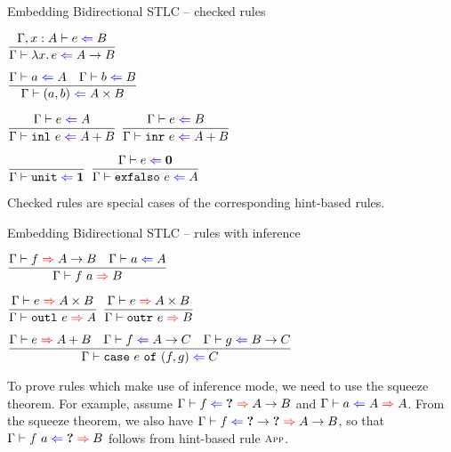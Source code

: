 \documentclass{beamer}
\begin{document}
\begin{frame}{Embedding Bidirectional STLC -- checked rules}

\begin{center}
  $\infrule{\fullcheck{\extend{\Gamma}{x}{A}}{e}{B}}{\check{\fun{x}{e}}{\Fun{A}{B}}}$

  \vspace{2em}

  $\infrule{\check{a}{A} \quad \check{b}{B}}{\check{\pair{a}{b}}{\Prod{A}{B}}}$

  \vspace{2em}

  $\infrule{\check{e}{A}}{\check{\inl{e}}{\Sum{A}{B}}}$ \quad
  $\infrule{\check{e}{B}}{\check{\inr{e}}{\Sum{A}{B}}}$

  \vspace{2em}

  $\infrule{}{\check{\unit}{\Unit}}$ \quad
  $\infrule{\check{e}{\Empty}}{\check{\exfalso{e}}{A}}$
\end{center}

\vspace{1em}

Checked rules are special cases of the corresponding hint-based rules.

\end{frame}

\begin{frame}{Embedding Bidirectional STLC -- rules with inference}

\begin{center}
  $\infrule{\infer{f}{\Fun{A}{B}} \quad \check{a}{A}}{\infer{\app{f}{a}}{B}}$

  \vspace{2em}

  $\infrule{\infer{e}{\Prod{A}{B}}}{\infer{\outl{e}}{A}}$ \quad
  $\infrule{\infer{e}{\Prod{A}{B}}}{\infer{\outr{e}}{B}}$

  \vspace{2em}

  $\infrule{\infer{e}{\Sum{A}{B}} \quad \check{f}{\Fun{A}{C}} \quad \check{g}{\Fun{B}{C}}}{\check{\case{e}{f}{g}}{C}}$
\end{center}

\vspace{1em}

To prove rules which make use of inference mode, we need to use the squeeze theorem. For example, assume $\hinting{f}{\Hole}{\Fun{A}{B}}$ and $\hinting{a}{A}{A}$. From the squeeze theorem, we also have $\hinting{f}{\Fun{\Hole}{\Hole}}{\Fun{A}{B}}$, so that $\hinting{\app{f}{a}}{\Hole}{B}$ follows from hint-based rule $\textsc{\footnotesize{App}}$.

\end{frame}
\end{document}
